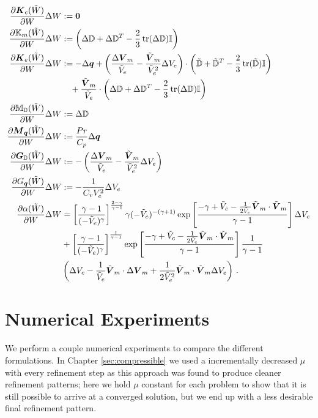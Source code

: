 \documentclass[Dissertation.tex]{subfiles}
\begin{document}
\begin{align*}
\frac{\partial\boldsymbol K_c(\tilde W)}{\partial W}\Delta W&:=
	\boldsymbol 0\\
\frac{\partial\mathbb{K}_m(\tilde W)}{\partial W}\Delta W&:=
	\left( \Delta\mathbb{D}+\Delta\mathbb{D}^T-\frac{2}{3}\operatorname*{tr}(\Delta\mathbb{D})\mathbb{I} \right)
	\\
\frac{\partial\boldsymbol K_e(\tilde W)}{\partial W}\Delta W&:=
	-\Delta\boldsymbol q+
	\left( \frac{\Delta\boldsymbol V_m}{\tilde V_e}-\frac{\tilde{\boldsymbol V}_m}{\tilde V_e^2}\Delta V_e \right)
	\cdot\left( \tilde{\mathbb{D}}+\tilde{\mathbb{D}}^T-\frac{2}{3}\operatorname*{tr}(\tilde{\mathbb{D}})\mathbb{I} \right)
	\\&\quad
	+\frac{\tilde{\boldsymbol V}_m}{\tilde V_e}\cdot\left( \Delta\mathbb{D}+\Delta\mathbb{D}^T-\frac{2}{3}\operatorname*{tr}(\Delta\mathbb{D})\mathbb{I} \right)\\
\frac{\partial\mathbb{M}_{\mathbb{D}}(\tilde W)}{\partial W}\Delta W&:=
	\Delta\mathbb{D}
	\\
\frac{\partial\boldsymbol M_{\boldsymbol q}(\tilde W)}{\partial W}\Delta W&:=
	\frac{Pr}{C_p}\Delta\boldsymbol q
	\\
\frac{\partial\boldsymbol G_{\mathbb{D}}(\tilde W)}{\partial W}\Delta W&:=
	-\left( \frac{\Delta\boldsymbol V_m}{\tilde V_e}-\frac{\tilde{\boldsymbol V}_m}{\tilde V_e^2}\Delta V_e \right)
	\\
\frac{\partial G_{\boldsymbol q}(\tilde W)}{\partial W}\Delta W&:=
	-\frac{1}{C_vV_e^2}\Delta V_e
	\\
\frac{\partial\alpha(\tilde W)}{\partial W}\Delta W&=
\left[ \frac{\gamma-1}{(-\tilde V_e)^\gamma} \right]^{\frac{2-\gamma}{\gamma-1}}
\gamma(-\tilde V_e)^{-(\gamma+1)}
\exp\left[ \frac{-\gamma+\tilde V_c-\frac{1}{2\tilde V_e}\tilde{\boldsymbol V}_m\cdot\tilde{\boldsymbol V}_m}{\gamma-1} \right]
\Delta V_e\\
&+\left[ \frac{\gamma-1}{(-\tilde V_e)^\gamma} \right]^{\frac{1}{\gamma-1}}
\exp\left[ \frac{-\gamma+\tilde V_c-\frac{1}{2\tilde V_e}\tilde{\boldsymbol V}_m\cdot\tilde{\boldsymbol V}_m}{\gamma-1} \right]
\frac{1}{\gamma-1}\\
&\left( \Delta V_c
-\frac{1}{\tilde V_e}\tilde{\boldsymbol V}_m\cdot\Delta\boldsymbol V_m
+\frac{1}{2\tilde V_e^2}\tilde{\boldsymbol V}_m\cdot\tilde{\boldsymbol V}_m\Delta V_e
 \right)\,.
\end{align*}


\section{Numerical Experiments}
We perform a couple numerical experiments to compare the different formulations.
In Chapter \ref{sec:compressible} we used a incrementally decreased $\mu$ with every refinement step 
as this approach was found to produce cleaner refinement patterns; here we hold $\mu$ constant
for each problem to show that it is still possible to arrive at a converged solution, but
we end up with a less desirable final refinement pattern.
\end{document}
